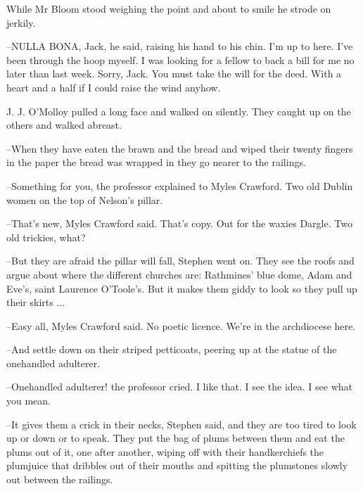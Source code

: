 While Mr Bloom stood weighing the point and about to smile he strode
on jerkily.



--NULLA BONA, Jack, he said, raising his hand to his chin. I'm up to
here. I've been through the hoop myself. I was looking for a fellow to
back a bill for me no later than last week. Sorry, Jack. You must take the
will for the deed. With a heart and a half if I could raise the wind
anyhow.

J. J. O'Molloy pulled a long face and walked on silently. They caught
up on the others and walked abreast.

--When they have eaten the brawn and the bread and wiped their twenty
fingers in the paper the bread was wrapped in they go nearer to the
railings.

--Something for you, the professor explained to Myles Crawford. Two old
Dublin women on the top of Nelson's pillar.



--That's new, Myles Crawford said. That's copy. Out for the waxies
Dargle. Two old trickies, what?

--But they are afraid the pillar will fall, Stephen went on. They see the
roofs and argue about where the different churches are: Rathmines' blue
dome, Adam and Eve's, saint Laurence O'Toole's. But it makes them giddy to
look so they pull up their skirts ...



--Easy all, Myles Crawford said. No poetic licence. We're in the
archdiocese here.

--And settle down on their striped petticoats, peering up at the statue
of the onehandled adulterer.

--Onehandled adulterer! the professor cried. I like that. I see the idea.
I see what you mean.



--It gives them a crick in their necks, Stephen said, and they are too
tired to look up or down or to speak. They put the bag of plums between
them and eat the plums out of it, one after another, wiping off with their
handkerchiefs the plumjuice that dribbles out of their mouths and spitting
the plumstones slowly out between the railings.

